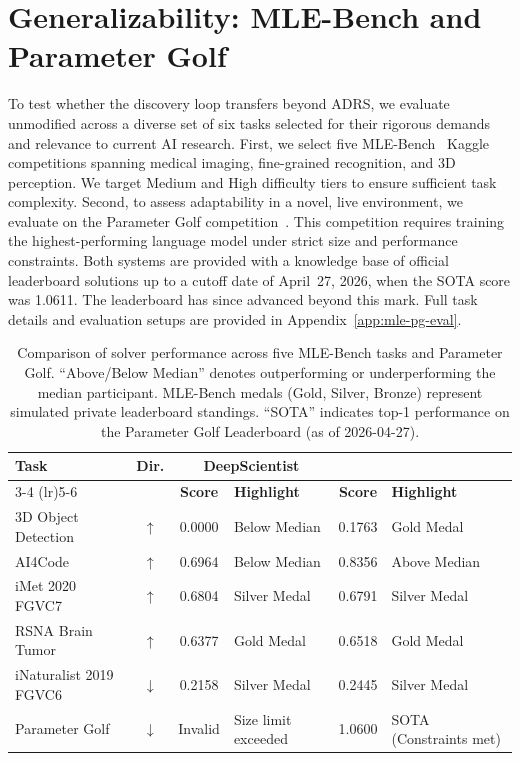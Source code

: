 \section{Generalizability: MLE-Bench and Parameter Golf}
\label{sec:generalizability}


To test whether the discovery loop transfers beyond ADRS, we evaluate \sys{} unmodified across a diverse set of six tasks selected for their rigorous demands and relevance to current AI research. 
First, we select five MLE-Bench~\citep{chan2024mle} Kaggle competitions spanning medical imaging, fine-grained recognition, and 3D perception. 
We target Medium and High difficulty tiers to ensure sufficient task complexity. 
Second, to assess adaptability in a novel, live environment, we evaluate \sys{} on the Parameter Golf competition~\citep{openai2026parametergolf}.
This competition requires training the highest-performing language model under strict size and performance constraints.
Both systems are provided with a knowledge base of official leaderboard solutions up to a cutoff date of April~27, 2026, when the SOTA score was 1.0611. The leaderboard has since advanced beyond this mark.
Full task details and evaluation setups are provided in Appendix~\ref{app:mle-pg-eval}.


\begin{table}[h]
\centering
\small
\caption{Comparison of solver performance across five MLE-Bench tasks and Parameter Golf. ``Above/Below Median'' denotes outperforming or underperforming the median participant. MLE-Bench medals (Gold, Silver, Bronze) represent simulated private leaderboard standings. ``SOTA'' indicates top-1 performance on the Parameter Golf Leaderboard (as of 2026-04-27). }
\label{tab:generalizability}
\begin{tabular}{l c c >{\centering\arraybackslash}m{3cm} c >{\centering\arraybackslash}m{3cm}}
    \toprule
    \multirow{2}{*}{\textbf{Task}} & \multirow{2}{*}{\textbf{Dir.}} & \multicolumn{2}{c}{\textbf{DeepScientist}} & \multicolumn{2}{c}{\textbf{\sys{}}} \\ \cmidrule(lr){3-4} \cmidrule(lr){5-6} 
    & & \textbf{Score} & \textbf{Highlight} & \textbf{Score} & \textbf{Highlight} \\ 
    \midrule
    3D Object Detection & $\uparrow$ & 0.0000 & Below Median & 0.1763 & Gold Medal \\
    AI4Code & $\uparrow$ & 0.6964 & Below Median & 0.8356 & Above Median \\
    iMet 2020 FGVC7 & $\uparrow$ & 0.6804 & Silver Medal & 0.6791 & Silver Medal \\
    RSNA Brain Tumor & $\uparrow$ & 0.6377 & Gold Medal & 0.6518 & Gold Medal \\ 
    iNaturalist 2019 FGVC6 & $\downarrow$ & 0.2158 & Silver Medal & 0.2445 & Silver Medal \\ \midrule
    Parameter Golf & $\downarrow$ & Invalid & Size limit exceeded & 1.0600 & SOTA (Constraints met) \\
    \bottomrule
\end{tabular}
\end{table}

